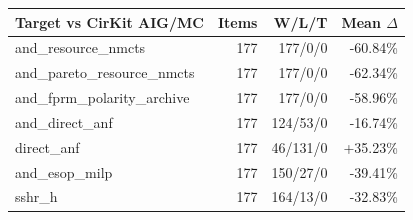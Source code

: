 \begin{tabular}{lrrr}
\toprule
Target vs CirKit AIG/MC & Items & W/L/T & Mean $\Delta$ \\
\midrule
and\_resource\_nmcts & 177 & 177/0/0 & -60.84\% \\
and\_pareto\_resource\_nmcts & 177 & 177/0/0 & -62.34\% \\
and\_fprm\_polarity\_archive & 177 & 177/0/0 & -58.96\% \\
and\_direct\_anf & 177 & 124/53/0 & -16.74\% \\
direct\_anf & 177 & 46/131/0 & +35.23\% \\
and\_esop\_milp & 177 & 150/27/0 & -39.41\% \\
sshr\_h & 177 & 164/13/0 & -32.83\% \\
\bottomrule
\end{tabular}
